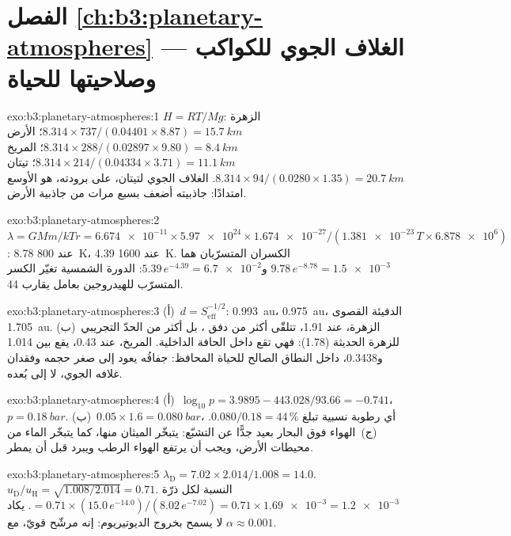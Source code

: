 \section*{الفصل \ref{ch:b3:planetary-atmospheres} --- الغلاف الجوي للكواكب وصلاحيتها للحياة}

\begin{solution}{exo:b3:planetary-atmospheres:1}
$H = RT/Mg$: الزهرة $8.314\times737/(0.04401\times8.87) = \qty{15.7}{km}$؛
الأرض $8.314\times288/(0.02897\times9.80) = \qty{8.4}{km}$؛ المريخ
$8.314\times214/(0.04334\times3.71) = \qty{11.1}{km}$؛ تيتان
$8.314\times94/(0.0280\times1.35) = \qty{20.7}{km}$. الغلاف الجوي لتيتان،
على برودته، هو الأوسع امتدادًا: جاذبيته أضعف بسبع مرات
من جاذبية الأرض.
\end{solution}

\begin{solution}{exo:b3:planetary-atmospheres:2}
$\lambda = GMm/kTr = \num{6.674e-11}\times\num{5.97e24}\times\num{1.674e-27}
/(\num{1.381e-23}\,T\times\num{6.878e6})$: 8.78 عند \qty{800}{K}، 4.39 عند
\qty{1600}{K}. الكسران المتسرّبان هما $9.78\,e^{-8.78} =
\num{1.5e-3}$ و$5.39\,e^{-4.39} = \num{6.7e-2}$: الدورة الشمسية
تغيّر الكسر المتسرّب للهيدروجين بعامل يقارب 44.
\end{solution}

\begin{solution}{exo:b3:planetary-atmospheres:3}
(أ)~$d = S_\mathrm{eff}^{-1/2}$:  \qty{0.993}{au}، 
\qty{0.975}{au}، الدفيئة القصوى \qty{1.705}{au}. (ب)~الزهرة، عند 1.91،
تتلقّى أكثر من دفق ، بل أكثر من الحدّ التجريبي
للزهرة الحديثة (1.78): فهي تقع داخل الحافة الداخلية. المريخ، عند 0.43،
يقع بين 1.014 و0.3438، داخل النطاق الصالح للحياة المحافظ:
جفافُه يعود إلى صغر حجمه وفقدان غلافه الجوي، لا
إلى بُعده.
\end{solution}

\begin{solution}{exo:b3:planetary-atmospheres:4}
(أ)~$\log_{10}p = 3.9895 - 443.028/93.66 = -0.741$، $p =
\qty{0.18}{bar}$. (ب)~$0.05\times1.6 = \qty{0.080}{bar}$، أي رطوبة نسبية
تبلغ $0.080/0.18 = 44\,\%$. (ج)~الهواء فوق البحار بعيد جدًّا عن
التشبّع: يتبخّر الميثان منها، كما يتبخّر الماء من محيطات
الأرض، ويجب أن يرتفع الهواء الرطب ويبرد قبل أن يمطر.
\end{solution}

\begin{solution}{exo:b3:planetary-atmospheres:5}
$\lambda_\mathrm D = 7.02\times2.014/1.008 = 14.0$. $u_\mathrm D/u_\mathrm H
= \sqrt{1.008/2.014} = 0.71$. النسبة لكل ذرّة $= 0.71\times(15.0\,
e^{-14.0})/(8.02\,e^{-7.02}) = 0.71\times\num{1.69e-3} = \num{1.2e-3}$.
يكاد  لا يسمح بخروج الديوتيريوم: إنه مرشّح قويّ، مع
$\alpha \approx 0.001$.
\end{solution}

